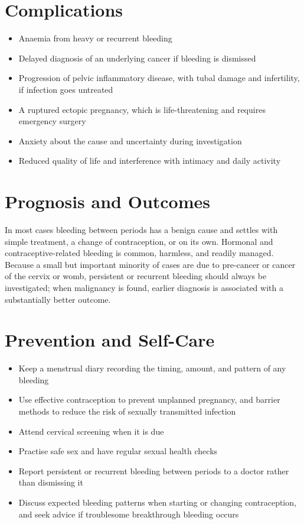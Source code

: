 \section*{Complications}
\begin{itemize}
    \item Anaemia from heavy or recurrent bleeding
    \item Delayed diagnosis of an underlying cancer if bleeding is dismissed
    \item Progression of pelvic inflammatory disease, with tubal damage and infertility, if infection goes untreated
    \item A ruptured ectopic pregnancy, which is life-threatening and requires emergency surgery
    \item Anxiety about the cause and uncertainty during investigation
    \item Reduced quality of life and interference with intimacy and daily activity
\end{itemize}

\section*{Prognosis and Outcomes}
In most cases bleeding between periods has a benign cause and settles with simple treatment, a change of contraception, or on its own. Hormonal and contraceptive-related bleeding is common, harmless, and readily managed. Because a small but important minority of cases are due to pre-cancer or cancer of the cervix or womb, persistent or recurrent bleeding should always be investigated; when malignancy is found, earlier diagnosis is associated with a substantially better outcome.

\section*{Prevention and Self-Care}
\begin{itemize}
    \item Keep a menstrual diary recording the timing, amount, and pattern of any bleeding
    \item Use effective contraception to prevent unplanned pregnancy, and barrier methods to reduce the risk of sexually transmitted infection
    \item Attend cervical screening when it is due
    \item Practise safe sex and have regular sexual health checks
    \item Report persistent or recurrent bleeding between periods to a doctor rather than dismissing it
    \item Discuss expected bleeding patterns when starting or changing contraception, and seek advice if troublesome breakthrough bleeding occurs
\end{itemize}

